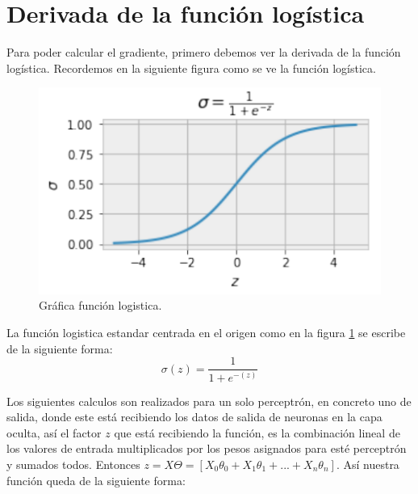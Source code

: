 \section{Derivada de la función logística}

Para poder calcular el gradiente, primero debemos ver la derivada de la función logística. Recordemos en la siguiente figura 
como se ve la función logística.

\begin{figure}[h]
 \centering
 \includegraphics[scale=0.5]{../Figuras/devLog1.png}
 \caption{Gráfica función logistica.}
 \label{fig:graficaLog1}
\end{figure}
\begin{figure}[h]
    \centering
        \caption[Funciones de activación]{}
        \label{fig:sigmoid-tanh}
\end{figure}


La función logistica estandar centrada en el origen como en la figura \ref{fig:graficaLog1} se escribe de la siguiente forma:
\begin{equation}
 \sigma(z) = \dfrac{1}{1+e^{-(z)}}
\end{equation}

Los siguientes calculos son realizados para un solo perceptrón, en concreto uno de salida, donde este está recibiendo los datos de salida de neuronas en la capa oculta, así el factor $z$ que está recibiendo la función, es la combinación lineal de los valores de entrada multiplicados por los pesos asignados para esté perceptrón y sumados todos. Entonces $z = X\Theta = [X_0\theta_0 +X_1\theta_1+...+X_n\theta_n]$. Así nuestra función queda de la siguiente forma:

